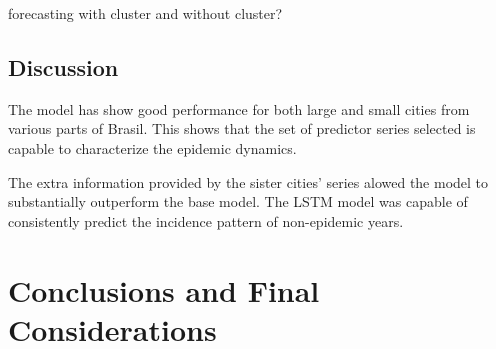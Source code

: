 \documentclass[12pt]{report}
\begin{document}
forecasting with cluster and without cluster?

\section{Discussion}

The model has show good performance for both large and small cities from various parts of Brasil. This shows that the set of predictor series selected is capable to characterize the epidemic dynamics.

The extra information provided by the sister cities' series alowed the model to substantially outperform the base model. The LSTM model was capable of consistently predict the incidence pattern of non-epidemic years. 

\newpage
\chapter{Conclusions and Final Considerations}

\newpage
{}
{}



\newpage
{}
{}
\end{document}
